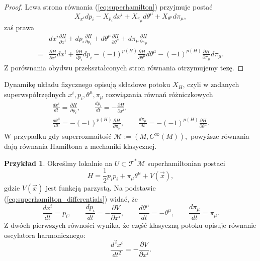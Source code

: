 \documentclass[11pt,a4paper]{report}
\theoremstyle{definition}
\newtheorem{example}[theorem]{Przykład}
\begin{document}
\begin{proof}
	Lewa strona równania (\ref{eq:superhamilton}) przyjmuje postać 
	\begin{equation*}
		X_{x^i} dp_i - X_{p_i} dx^i + X_{\pi_\mu} d\theta^\mu + X_{\theta^\mu} d\pi_\mu,
	\end{equation*}
	zaś prawa
	\begin{equation*}
		\begin{aligned}
			  & dx^i \frac{\partial H}{\partial x^i} + dp_i \frac{\partial H}{\partial p_i} + d\theta^\mu \frac{\partial H}{\partial \theta^\mu} + d\pi_\mu \frac{\partial H}{\partial \pi_\mu} \\
			= & \frac{\partial H}{\partial x^i} dx^i                                                                                                                                            
			+ \frac{\partial H}{\partial p_i} dp_i
			-(-1)^{p(H)} \frac{\partial H}{\partial \theta^\mu} d\theta^\mu
			-(-1)^{p(H)} \frac{\partial H}{\partial \pi_\mu} d\pi_\mu.
		\end{aligned}
	\end{equation*}
	Z porównania obydwu przekształconych stron równania otrzymujemy tezę.
\end{proof}
			      				
Dynamikę układu fizycznego opisują składowe potoku $X_H$, czyli w zadanych superwspółrzędnych $x^i, p_i, \theta^\mu, \pi_\mu$ rozwiązania równań różniczkowych
\begin{equation}
	\label{eq:superhamilton_differentials}
	\begin{gathered}
		\frac{dx^i}{dt} = \frac{\partial H}{\partial p_i}, \qquad
		\frac{dp_i}{dt} = -\frac{\partial H}{\partial x^i}, \\
		\frac{d\theta^\mu}{dt} = -(-1)^{p(H)} \frac{\partial H}{\partial \pi_\mu}, \qquad
		\frac{d\pi_\mu}{dt} = -(-1)^{p(H)} \frac{\partial H}{\partial \theta^\mu}.
	\end{gathered}
\end{equation}
W przypadku gdy superrozmaitość $\mathcal{M} := (M, C^\infty (M)),$ powyższe równania dają równania Hamiltona z mechaniki klasycznej.
			      				
\begin{example}
	Określmy lokalnie na $U \subset \mathcal{T^*M}$ superhamiltonian postaci
	\begin{equation*}
		H = \frac12 p_i p_i + \pi_\mu \theta^\mu + V(\overrightarrow{x}),
	\end{equation*}
	gdzie $V(\overrightarrow{x})$ jest funkcją parzystą. Na podstawie (\ref{eq:superhamilton_differentials}) widać, że
	\begin{equation*}
		\frac{dx^i}{dt} = p_i, \qquad
		\frac{dp_i}{dt} = -\frac{\partial V}{\partial x^i}, \qquad
		\frac{d\theta^\mu}{dt} = -\theta^\mu, \qquad
		\frac{d\pi_\mu}{dt} = \pi_\mu.
	\end{equation*}
	Z dwóch pierwszych równości wynika, że część klasyczną potoku opisuje równanie oscylatora harmonicznego:
	\begin{equation*}
		\frac{d^2 x^i}{dt^2} = - \frac{\partial V}{\partial x^i}.
	\end{equation*}
\end{example}
			      				
\end{document}
